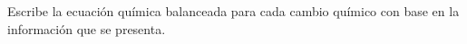 Escribe la ecuación química balanceada para cada cambio químico con base en la información que se presenta.
\begin{parts}
    
    
    
    
\end{parts}